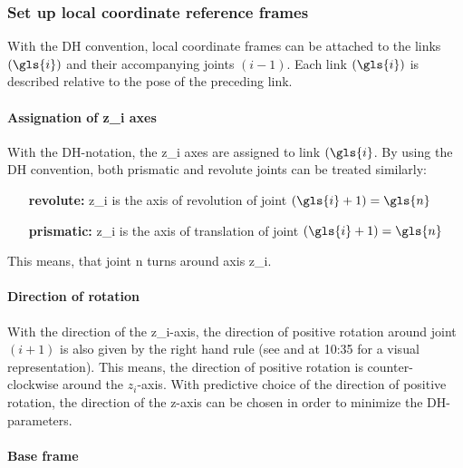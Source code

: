\subsubsection{Set up local coordinate reference frames} \label{sec:localRefFrame}
With the \ac{DH} convention, local coordinate frames can be attached to the links $ (\gls{i}) $ and their accompanying joints $ (i-1) $.
Each link $(\gls{i})$ is described relative to the pose of the preceding link.



\paragraph{Assignation of \gls{z_i} axes}\label{par:z_iAxesAssign}

With the \ac{DH}-notation, the \gls{z_i} axes are assigned to link $(\gls{i}$. 
By using the  \ac{DH} convention, both prismatic and revolute joints can be treated similarly: %
\begin{itemize}[wide=\parindent]
	\item[\textbf{revolute:}] \gls{z_i} is the axis of revolution of joint $(\gls{i}+1) = \gls{n}$
	\item[\textbf{prismatic:}] \gls{z_i} is the axis of translation of joint $(\gls{i}+1) = \gls{n}$
\end{itemize}
This means, that joint \gls{n} turns around axis \gls{z_i}.

\paragraph{Direction of rotation}
With the direction of the \gls{z_i}-axis, the direction of positive rotation around joint $(i+1)$ is also given by the right hand rule (see \cite{RightHandRule} and \cite{Angela_U1S2P1} at 10:35 for a visual representation). This means, the direction of positive rotation is counter-clockwise around the $z_i$-axis.
With predictive choice of the direction of positive rotation, the direction of the z-axis can be chosen in order to minimize the DH-parameters. %



\paragraph{Base frame}

